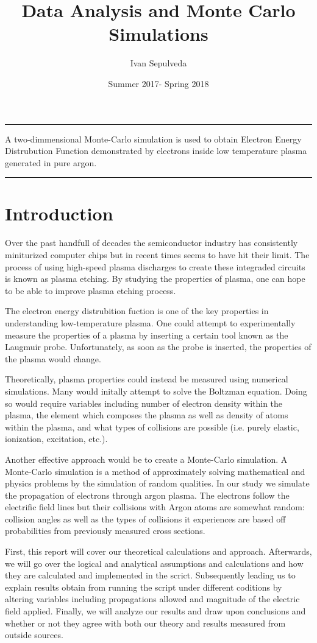 \documentclass[12pt]{article}
\title{Data Analysis and Monte Carlo Simulations\vspace{-2ex}}
\author{\vspace{-3ex}Ivan Sepulveda\vspace{-3ex}}
\date{\vspace{-1.5ex}Summer 2017-  Spring 2018\vspace{-2ex}}
\begin{document}
\maketitle
\hrule
\vspace{2ex}
A two-dimmensional Monte-Carlo simulation is used to obtain Electron Energy Distrubution Function demonstrated by electrons inside low temperature plasma generated in pure argon.
\vspace{1ex}
\hrule


\section{Introduction}

Over the past handfull of decades the semiconductor industry has consistently miniturized computer chips but in recent times seems to 
have hit their limit. The process of using high-speed plasma discharges to create these integraded circuits is known as plasma etching. 
By studying the properties of plasma, one can hope to be able to improve plasma etching process.

The electron energy distrubition fuction is one of the key properties in understanding low-temperature plasma. One could attempt to 
experimentally measure the properties of a plasma by inserting a certain tool known as the Laugmuir probe. Unfortunately, as soon as 
the probe is inserted, the properties of the plasma would change. 

Theoretically, plasma properties could instead be measured using numerical simulations. Many would initally attempt to solve the 
Boltzman equation. Doing so would require variables including number of electron density within the plasma, the element which 
composes the plasma as well as density of atoms within the plasma, and what types of collisions are possible (i.e. purely elastic, 
ionization, excitation, etc.).

Another effective approach would be to create a Monte-Carlo simulation. A Monte-Carlo simulation is a method of approximately solving mathematical and physics problems by the simulation of random qualities. In our study we simulate the propagation of electrons through argon plasma. The electrons follow the electrific field lines but their collisions with Argon atoms are somewhat random: collision angles as well as the types of collisions it 
experiences are based off probabilities from previously measured cross sections.

First, this report will cover our theoretical calculations and approach. Afterwards, we will go over the logical and analytical assumptions 
and calculations and how they are calculated and implemented in the scrict. Subsequently leading us to explain results obtain from 
running the script under different coditions by altering variables including propagations allowed and magnitude of the electric field 
applied. Finally, we will analyze our results and draw upon conclusions and whether or not they agree with both our theory and results 
measured from outside sources.
\end{document}
